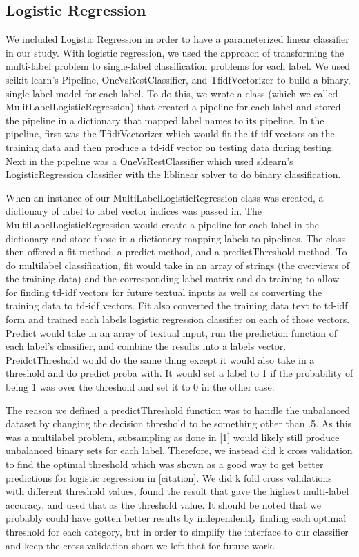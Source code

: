 \documentclass[sigconf]{acmart}
\begin{document}
\subsection{Logistic Regression}
We included Logistic Regression in order to have a parameterized linear classifier in our study. With logistic regression, we used the approach of transforming the multi-label problem to single-label classification problems for each label. We used scikit-learn's Pipeline, OneVsRestClassifier, and TfidfVectorizer to build a binary, single label model for each label.  To do this, we wrote a class (which we called MulitLabelLogisticRegression) that created a pipeline for each label and stored the pipeline in a dictionary that mapped label names to its pipeline. In the pipeline, first was the TfidfVectorizer which would fit the tf-idf vectors on the training data and then produce a td-idf vector on testing data during testing.  Next in the pipeline was a OneVsRestClassifier which used sklearn's LogisticRegression classifier with the liblinear solver to do binary classification. 

When an instance of our MultiLabelLogisticRegression class was created, a dictionary of label to label vector indices was passed in.  The MultiLabelLogisticRegression would create a pipeline for each label in the dictionary and store those in a dictionary mapping labels to pipelines. The class then offered a fit method, a predict method, and a predictThreshold method. To do multilabel classification, fit would take in an array of strings (the overviews of the training data) and the corresponding label matrix and do training to allow for finding td-idf vectors for future textual inputs as well as converting the training data to td-idf vectors. Fit also converted the training data text to td-idf form and trained each labels logistic regression classifier on each of those vectors. Predict would take in an array of textual input, run the prediction function of each label's classifier, and combine the results into a labels vector.  PreidctThreshold would do the same thing except it would also take in a threshold and do predict proba with. It would set a label to 1 if the probability of being 1 was over the threshold and set it to 0 in the other case. 

The reason we defined a predictThreshold function was to handle the unbalanced dataset by changing the decision threshold to be something other than .5.  As this was a multilabel problem, subsampling as done in [1] would likely still produce unbalanced binary sets for each label.  Therefore, we instead did k cross validation to find the optimal threshold which was shown as a good way to get better predictions for logistic regression in [citation]. We did k fold cross validations with different threshold values, found the result that gave the highest multi-label accuracy, and used that as the threshold value.  It should be noted that we probably could have gotten better results by independently finding each optimal threshold for each category, but in order to simplify the interface to our classifier and keep the cross validation short we left that for future work. 
\end{document}
